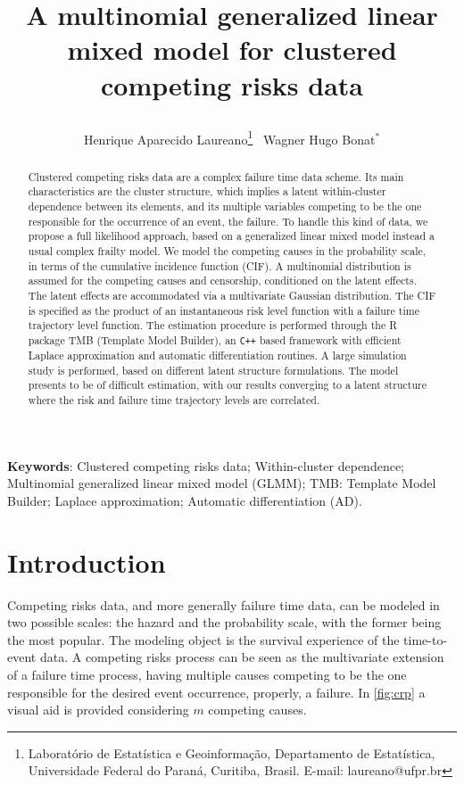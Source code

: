 \documentclass[a4paper,12pt]{article}
\title{
  
  A multinomial generalized linear mixed model for clustered competing
  risks data

}
\author{
  Henrique Aparecido Laureano\thanks{
    Laborat\'{o}rio de Estat\'{i}stica e Geoinforma\c{c}\~{a}o,
    Departamento de Estat\'{i}stica,
    Universidade Federal do Paran\'{a}, Curitiba, Brasil.
    E-mail: laureano@ufpr.br
  }~
  Wagner Hugo Bonat$^\ast$}
\begin{document}
\maketitle

\begin{abstract}

  Clustered competing risks data are a complex failure time data
  scheme. Its main characteristics are the cluster structure, which
  implies a latent within-cluster dependence between its elements, and
  its multiple variables competing to be the one responsible for the
  occurrence of an event, the failure. To handle this kind of data, we
  propose a full likelihood approach, based on a generalized linear
  mixed model instead a usual complex frailty model. We model the
  competing causes in the probability scale, in terms of the cumulative
  incidence function (CIF). A multinomial distribution is assumed for
  the competing causes and censorship, conditioned on the latent
  effects. The latent effects are accommodated via a multivariate
  Gaussian distribution. The CIF is specified as the product of an
  instantaneous risk level function with a failure time trajectory level
  function. The estimation procedure is performed through the R package
  TMB (Template Model Builder), an \texttt{C++} based framework with
  efficient Laplace approximation and automatic differentiation
  routines. A large simulation study is performed, based on different
  latent structure formulations. The model presents to be of difficult
  estimation, with our results converging to a latent structure where
  the risk and failure time trajectory levels are correlated.

\end{abstract}
\vfill
\noindent\textbf{Keywords}: 
Clustered competing risks data;
Within-cluster dependence;
Multinomial generalized linear mixed model (GLMM);
TMB: Template Model Builder;
Laplace approximation;
Automatic differentiation (AD).
\vspace{0.2cm}
\newpage

\section{Introduction}

Competing risks data, and more generally failure time data, can be
modeled in two possible scales: the hazard and the probability scale,
with the former being the most popular. The modeling object is the
survival experience of the time-to-event data. A competing risks process
can be seen as the multivariate extension of a failure time process,
having multiple causes competing to be the one responsible for the
desired event occurrence, properly, a failure. In \autoref{fig:crp} a
visual aid is provided considering \(m\) competing causes.
\end{document}
